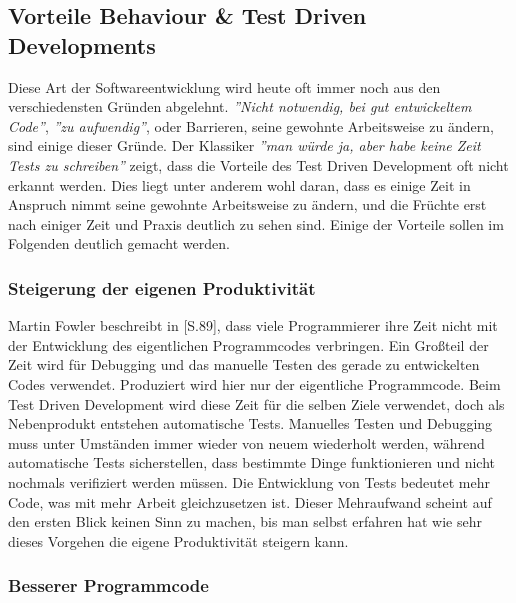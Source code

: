 \subsection{Vorteile Behaviour \& Test Driven Developments}

Diese Art der Softwareentwicklung wird heute oft immer noch aus den
verschiedensten Gründen abgelehnt. \textit{''Nicht notwendig, bei gut
  entwickeltem Code''}, \textit{''zu aufwendig''}, oder Barrieren,
seine gewohnte Arbeitsweise zu ändern, sind einige dieser Gründe. Der
Klassiker \textit{''man würde ja, aber habe keine Zeit Tests zu
  schreiben''} zeigt, dass die Vorteile des Test Driven Development
oft nicht erkannt werden. Dies liegt unter anderem wohl daran, dass es
einige Zeit in Anspruch nimmt seine gewohnte Arbeitsweise zu ändern,
und die Früchte erst nach einiger Zeit und Praxis deutlich zu sehen
sind. Einige der Vorteile sollen im Folgenden deutlich gemacht werden.

\subsubsection{Steigerung der eigenen Produktivität}

Martin Fowler beschreibt in \cite{Fowler1999}[S.89], dass viele
Programmierer ihre Zeit nicht mit der Entwicklung des eigentlichen
Programmcodes verbringen. Ein Großteil der Zeit wird für Debugging und
das manuelle Testen des gerade zu entwickelten Codes
verwendet. Produziert wird hier nur der eigentliche Programmcode. Beim
Test Driven Development wird diese Zeit für die selben Ziele
verwendet, doch als Nebenprodukt entstehen automatische
Tests. Manuelles Testen und Debugging muss unter Umständen immer
wieder von neuem wiederholt werden, während automatische Tests
sicherstellen, dass bestimmte Dinge funktionieren und nicht nochmals
verifiziert werden müssen. Die Entwicklung von Tests bedeutet mehr
Code, was mit mehr Arbeit gleichzusetzen ist. Dieser Mehraufwand
scheint auf den ersten Blick keinen Sinn zu machen, bis man selbst
erfahren hat wie sehr dieses Vorgehen die eigene Produktivität
steigern kann.

\subsubsection{Besserer Programmcode}


